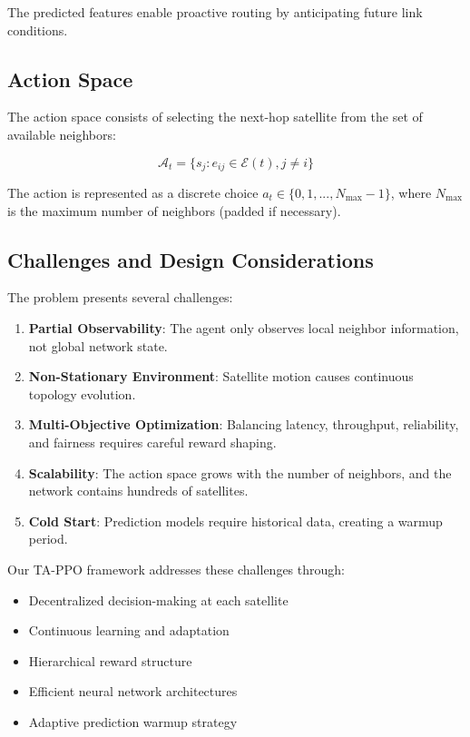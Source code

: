 The predicted features enable proactive routing by anticipating future link conditions.

\subsection{Action Space}

The action space consists of selecting the next-hop satellite from the set of available neighbors:

\begin{equation}
\mathcal{A}_t = \{s_j : e_{ij} \in \mathcal{E}(t), j \neq i\}
\end{equation}

The action is represented as a discrete choice $a_t \in \{0, 1, ..., N_{\max}-1\}$, where $N_{\max}$ is the maximum number of neighbors (padded if necessary).

\subsection{Challenges and Design Considerations}

The problem presents several challenges:

\begin{enumerate}
\item \textbf{Partial Observability}: The agent only observes local neighbor information, not global network state.

\item \textbf{Non-Stationary Environment}: Satellite motion causes continuous topology evolution.

\item \textbf{Multi-Objective Optimization}: Balancing latency, throughput, reliability, and fairness requires careful reward shaping.

\item \textbf{Scalability}: The action space grows with the number of neighbors, and the network contains hundreds of satellites.

\item \textbf{Cold Start}: Prediction models require historical data, creating a warmup period.
\end{enumerate}

Our TA-PPO framework addresses these challenges through:
\begin{itemize}
\item Decentralized decision-making at each satellite
\item Continuous learning and adaptation
\item Hierarchical reward structure
\item Efficient neural network architectures
\item Adaptive prediction warmup strategy
\end{itemize}

